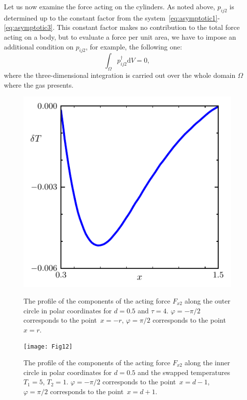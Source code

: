 \documentclass[smallextended, referee]{svjour3} %
\newcommand{\dd}{\mathrm{d}}
\begin{document}
Let us now examine the force acting on the cylinders.
As noted above, \(p_{ij2}\) is determined up to the constant factor
from the system~\eqref{eq:asymptotic1}-\eqref{eq:asymptotic3}.
This constant factor makes no contribution to the total force acting on a body,
but to evaluate a force per unit area, we have to impose an additional condition
on \(p_{ij2}\), for example, the following one:
\begin{equation}\label{eq:dag_condition}
    \int_\Omega p^\dag_{ij2}\dd{V} = 0,
\end{equation}
where the three-dimensional integration is carried out over the whole domain \(\Omega\) where the gas presents.

\begin{figure}[ht]
    \centering
    \begin{minipage}{.48\textwidth}
        \centering
        \includegraphics{Fig11}
        \caption{The profile of the components of the acting force \(F_{x2}\) along
                the outer circle in polar coordinates for \(d=0.5\) and \(\tau=4\).
                \(\varphi = -\pi/2\) corresponds to the point~\(x=-r\),
                \(\varphi = \pi/2\) corresponds to the point~\(x=r\).}
        \label{fig:terms:outer}
    \end{minipage}
    \quad
    \begin{minipage}{.48\textwidth}
        \centering
        \texttt{[image: Fig12]}
        \caption{The profile of the components of the acting force \(F_{x2}\)
                along the inner circle in polar coordinates
                for \(d=0.5\) and the swapped temperatures \(T_1 = 5\), \(T_2 = 1\).
                \(\varphi = -\pi/2\) corresponds to the point~\(x=d-1\),
                \(\varphi = \pi/2\) corresponds to the point~\(x=d+1\).}
        \label{fig:terms:inner-swap}
    \end{minipage}
\end{figure}
\end{document}
